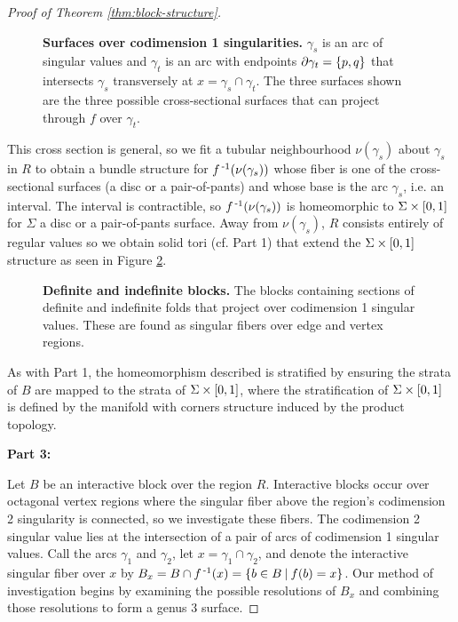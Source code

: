 \begin{proof}[Proof of Theorem \ref{thm:block-structure}]
	\begin{figure}[h!]
		\caption{
			\textbf{Surfaces over codimension 1 singularities.}
			$\gamma_s$ is an arc of singular values and $\gamma_t$ is an arc with endpoints $\partial\gamma_t = \{p,q\}$ that intersects $\gamma_s$ transversely at $x=\gamma_s\cap\gamma_t$.
			The three surfaces shown are the three possible cross-sectional surfaces that can project through $f$ over $\gamma_t$.
		}
		\label{fig:codim-1-surfaces}
	\end{figure}
	
	This cross section is general, so we fit a tubular neighbourhood $\nu(\gamma_s)$ about $\gamma_s$ in $R$ to obtain a bundle structure for $f^{\,\text{-}1}(\nu(\gamma_s))$ whose fiber is one of the cross-sectional surfaces (a disc or a pair-of-pants) and whose base is the arc $\gamma_s$, i.e. an interval.
	The interval is contractible, so $f^{\,\text{-}1}(\nu(\gamma_s))$ is homeomorphic to $\Sigma\times[0,1]$ for $\Sigma$ a disc or a pair-of-pants surface.
	Away from $\nu(\gamma_s)$, $R$ consists entirely of regular values so we obtain solid tori (cf. Part 1) that extend the $\Sigma\times[0,1]$ structure as seen in Figure \ref{fig:codim-1-blocks}.
		
	\begin{figure}[h!]
		\caption{
			\textbf{Definite and indefinite blocks.}
			The blocks containing sections of definite and indefinite folds that project over codimension 1 singular values.
			These are found as singular fibers over edge and vertex regions.
		}
		\label{fig:codim-1-blocks}
	\end{figure}

	As with Part 1, the homeomorphism described is stratified by ensuring the strata of $B$ are mapped to the strata of $\Sigma \times [0,1]$, where the stratification of $\Sigma \times [0,1]$ is defined by the manifold with corners structure induced by the product topology.
	
	\textbf{Part 3:}
	
	Let $B$ be an interactive block over the region $R$.
	Interactive blocks occur over octagonal vertex regions where the singular fiber above the region's codimension 2 singularity is connected, so we investigate these fibers.
	The codimension 2 singular value lies at the intersection of a pair of arcs of codimension 1 singular values.
	Call the arcs $\gamma_1$ and $\gamma_2$, let $x = \gamma_1\cap \gamma_2$, and denote the interactive singular fiber over $x$ by $B_x = B\cap f^{\,\text{-}1}(x) = \{b\in B\:|\:f(b)=x\}$.
	Our method of investigation begins by examining the possible resolutions of $B_x$ and combining those resolutions to form a genus 3 surface.
	 

\end{proof}

